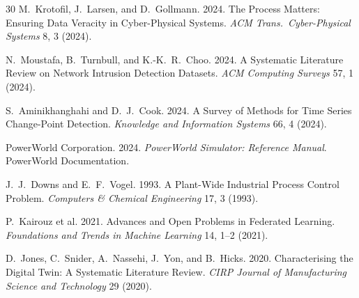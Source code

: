 \documentclass[sigconf,nonacm]{acmart}
\begin{document}
\begin{thebibliography}{30}
M.~Krotofil, J.~Larsen, and D.~Gollmann. 2024. The Process
Matters: Ensuring Data Veracity in Cyber-Physical Systems.
\textit{ACM Trans.\ Cyber-Physical Systems} 8, 3 (2024).

N.~Moustafa, B.~Turnbull, and K.-K.~R.~Choo. 2024. A Systematic
Literature Review on Network Intrusion Detection Datasets.
\textit{ACM Computing Surveys} 57, 1 (2024).

S.~Aminikhanghahi and D.~J.~Cook. 2024. A Survey of Methods for
Time Series Change-Point Detection.
\textit{Knowledge and Information Systems} 66, 4 (2024).

PowerWorld Corporation. 2024. \textit{PowerWorld Simulator:
Reference Manual}. PowerWorld Documentation.

J.~J.~Downs and E.~F.~Vogel. 1993. A Plant-Wide Industrial
Process Control Problem. \textit{Computers \& Chemical
Engineering} 17, 3 (1993).

P.~Kairouz et al. 2021. Advances and Open Problems in Federated
Learning. \textit{Foundations and Trends in Machine Learning} 14,
1--2 (2021).

D.~Jones, C.~Snider, A.~Nassehi, J.~Yon, and B.~Hicks. 2020.
Characterising the Digital Twin: A Systematic Literature Review.
\textit{CIRP Journal of Manufacturing Science and Technology} 29
(2020).

\end{thebibliography}
\end{document}

